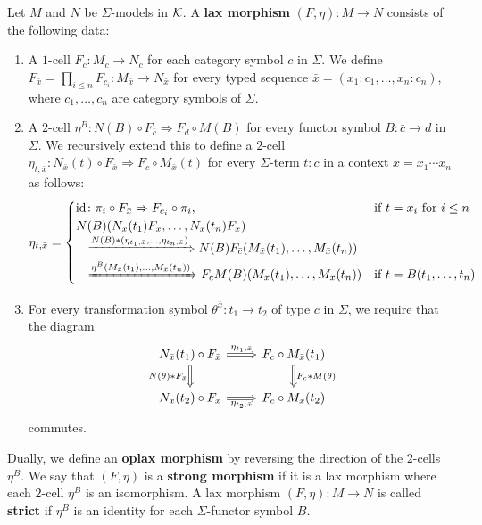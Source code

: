 \begin{definition}\label{def:laxStrongMorphisms}
   Let $M$ and $N$ be $\Sigma$-models in $\mathcal{K}$. A \textbf{lax morphism} $(F,\eta) \colon M \to N$ consists of the following data:
   \begin{enumerate}
       \item A $1$-cell $F_c \colon M_c \to N_c$ for each category symbol $c$ in $\Sigma$. We define $F_{\bar{x}} = \prod_{i\leq n} F_{c_i}\colon M_{\bar{x}}\to N_{\bar{x}}$ for every typed sequence $\bar{x} = (x_1\colon c_1,\ldots, x_n\colon c_n)$, where $c_1,\ldots, c_n$ are category symbols of $\Sigma$.
       \item A $2$-cell $\eta^B \colon N(B) \circ F_{\bar{c}} \Rightarrow F_d \circ M(B)$ for every functor symbol $B \colon \bar{c} \to d$ in $\Sigma$. We recursively extend this to define a $2$-cell $\eta_{t, \bar{x}} \colon N_{\bar{x}}(t) \circ F_{\bar{x}} \Rightarrow F_c \circ M_{\bar{x}} (t)$ for every $\Sigma$-term $t \colon c$ in a context $\bar{x} = x_1\cdots x_n$ as follows:
       {\small
   \begin{equation}\label{eq:fromPathToATransformation}
       \eta_{t,\bar{x}} = \begin{cases}
   \mathrm{id}\colon \pi_i\circ F_{\bar{x}}\Rightarrow F_{c_i}\circ \pi_i, & \text{if $t = x_i$ for $i\leq n$} \\
   N(B)(N_{\bar{x}}(t_1)F_{\bar{x}},\ldots, N_{\bar{x}}(t_n)F_{\bar{x}}) \\
\quad \xRightarrow{N(B)*(\eta_{t_1,\bar{x}},\dots, \eta_{t_n, \bar{x}})} N(B)F_{\bar{c}}(M_{\bar{x}}(t_1),\dots, M_{\bar{x}}(t_n))\\
   \quad \xRightarrow{\eta^B(M_{\bar{x}}(t_1),\dots, M_{\bar{x}}(t_n))} F_c M(B)(M_{\bar{x}}(t_1),\dots, M_{\bar{x}}(t_n)) & \text{if $t = B(t_1,\dots, t_n)$}
\end{cases}
\end{equation}
}
       \item For every transformation symbol $\theta^{\bar{x}} \colon t_1 \to t_2$ of type $c$ in $\Sigma$, we require that the diagram
       $$
       \begin{tikzcd}[ampersand replacement=\&]
       N_{\bar{x}}(t_1) \circ F_{\bar{x}} \arrow[r, "\eta_{t_1, \bar{x}}", Rightarrow] \arrow[d, "N(\theta)*F_{\bar{x}}"', Rightarrow] \& F_c \circ M_{\bar{x}}(t_1) \arrow[d, "F_c*M(\theta)", Rightarrow] \\
       N_{\bar{x}}(t_2) \circ F_{\bar{x}} \arrow[r, "\eta_{t_2, \bar{x}}"' , Rightarrow]                                               \& F_c \circ M_{\bar{x}}(t_2)
       \end{tikzcd}
       $$
       commutes.
   \end{enumerate}
   Dually, we define an \textbf{oplax morphism} by reversing the direction of the $2$-cells $\eta^B$. We say that $(F,\eta)$ is a \textbf{strong morphism} if it is a lax morphism where each $2$-cell $\eta^B$ is an isomorphism. A lax morphism $(F,\eta)\colon M\to N$ is called \textbf{strict} if $\eta^B$ is an identity for each $\Sigma$-functor symbol $B$.
\end{definition}

